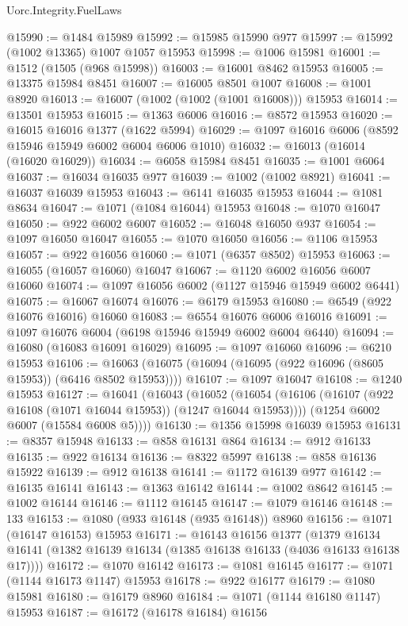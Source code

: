 \begin{lexlean}{Uorc.Integrity.FuelLaws}
\begin{coremodule}
@15990 := @1484 @15989
@15992 := @15985 @15990 @977
@15997 := @15992 (@1002 @13365) @1007 @1057 @15953
@15998 := @1006 @15981
@16001 := @1512 (@1505 (@968 @15998))
@16003 := @16001 @8462 @15953
@16005 := @13375 @15984 @8451
@16007 := @16005 @8501 @1007
@16008 := @1001 @8920
@16013 := @16007 (@1002 (@1002 (@1001 @16008))) @15953
@16014 := @13501 @15953
@16015 := @1363 @6006
@16016 := @8572 @15953
@16020 := @16015 @16016 @1377 (@1622 @5994)
@16029 := @1097 @16016 @6006 (@8592 @15946 @15949 @6002 @6004 @6006 @1010)
@16032 := @16013 (@16014 (@16020 @16029))
@16034 := @6058 @15984 @8451
@16035 := @1001 @6064
@16037 := @16034 @16035 @977
@16039 := @1002 (@1002 @8921)
@16041 := @16037 @16039 @15953
@16043 := @6141 @16035 @15953
@16044 := @1081 @8634
@16047 := @1071 (@1084 @16044) @15953
@16048 := @1070 @16047
@16050 := @922 @6002 @6007
@16052 := @16048 @16050 @937
@16054 := @1097 @16050 @16047
@16055 := @1070 @16050
@16056 := @1106 @15953
@16057 := @922 @16056
@16060 := @1071 (@6357 @8502) @15953
@16063 := @16055 (@16057 @16060) @16047
@16067 := @1120 @6002 @16056 @6007 @16060
@16074 := @1097 @16056 @6002 (@1127 @15946 @15949 @6002 @6441)
@16075 := @16067 @16074
@16076 := @6179 @15953
@16080 := @6549 (@922 @16076 @16016) @16060
@16083 := @6554 @16076 @6006 @16016
@16091 := @1097 @16076 @6004 (@6198 @15946 @15949 @6002 @6004 @6440)
@16094 := @16080 (@16083 @16091 @16029)
@16095 := @1097 @16060
@16096 := @6210 @15953
@16106 := @16063 (@16075 (@16094 (@16095 (@922 @16096 (@8605 @15953)) (@6416 @8502 @15953))))
@16107 := @1097 @16047
@16108 := @1240 @15953
@16127 := @16041
    (@16043
      (@16052
        (@16054 (@16106 (@16107 (@922 @16108 (@1071 @16044 @15953)) (@1247 @16044 @15953))))
        (@1254 @6002 @6007 (@15584 @6008 @5))))
@16130 := @1356 @15998 @16039 @15953
@16131 := @8357 @15948
@16133 := @858 @16131 @864
@16134 := @912 @16133
@16135 := @922 @16134
@16136 := @8322 @5997
@16138 := @858 @16136 @15922
@16139 := @912 @16138
@16141 := @1172 @16139 @977
@16142 := @16135 @16141
@16143 := @1363 @16142
@16144 := @1002 @8642
@16145 := @1002 @16144
@16146 := @1112 @16145
@16147 := @1079 @16146
@16148 := 133
@16153 := @1080 (@933 @16148 (@935 @16148)) @8960
@16156 := @1071 (@16147 @16153) @15953
@16171 := @16143
    @16156
    @1377
    (@1379 @16134 @16141 (@1382 @16139 @16134 (@1385 @16138 @16133 (@4036 @16133 @16138 @17))))
@16172 := @1070 @16142
@16173 := @1081 @16145
@16177 := @1071 (@1144 @16173 @1147) @15953
@16178 := @922 @16177
@16179 := @1080 @15981
@16180 := @16179 @8960
@16184 := @1071 (@1144 @16180 @1147) @15953
@16187 := @16172 (@16178 @16184) @16156

\end{coremodule}
\end{lexlean}
